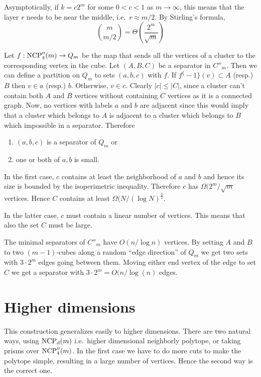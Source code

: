Asymptotically, if $k = c2^m$ for some $0<c<1$ as $m\rightarrow \infty$, this 
means that the layer $r$ needs to be near the middle, i.e.\ $r\approx m/2$. 
By Stirling's formula,
\begin{equation}
 {m \choose m/2} = \Theta \left(\frac{2^m}{\sqrt{m}}\right)
\end{equation}

Let $f: \textrm{NCP}''_4(m) \rightarrow Q_m$ 
be the map that sends all the vertices of a cluster to the corresponding vertex 
in the cube. 
Let $(A,B,C)$ be a separator in $C''_m$. Then we can define a partition on 
$Q_m$ to sets $(a,b,c)$ with $f$. If $f^\{-1\}(v) \subset A$ (resp.) $B$ then 
$v \in a$ (resp.) $b$. Otherwise, $v \in c$. Clearly $|c| \leq |C|$, since a 
cluster can't contain both $A$ and $B$ vertices without containing $C$ vertices 
as it is a connected graph.
Now, no vertices with labels $a$ and $b$ are adjacent since this would imply 
that a cluster which belongs to $A$ is adjacent to a cluster which belongs to 
$B$ which impossible in a separator. Therefore
\begin{enumerate}
 \item $(a,b,c)$ is a separator of $Q_m$ or
\item one or both of $a,b$ is small.
\end{enumerate}
In the first case, $c$ contains at least the neighborhood of $a$ and $b$ and 
hence its size is bounded by the isoperimetric inequality. Therefore $c$ has 
$\Omega(2^m/\sqrt{m}$ vertices. Hence $C$ contains at least $\Omega(N/(\log 
N)^{\frac{3}{2}}$.

In the latter case, $c$ must contain a linear number of vertices. This means 
that also the set $C$ must be large.  

The minimal separators of $C''_m$ have $O(n/\log n)$ vertices. By setting $A$ 
and $B$ to two $(m-1)$-cubes along a random ``edge direction'' of $Q_m$ we get 
two sets with $3\cdot 2^m$ edges going between them. Moving either end vertex 
of the edge to set $C$ we get a separator with $3\cdot 2^m = O(n/\log(n)$ 
edges.

\section{Higher dimensions}

This construction generalizes easily to higher dimensions. There are two 
natural ways, using $\textrm{NCP}_d(m)$ i.e.\ higher dimensional neighborly polytope, or 
taking prisms over $\textrm{NCP}''_4(m)$.  In the first case we have to do more cuts to 
make the polytope simple, resulting in a large number of vertices. Hence the 
second way is the correct one. 

